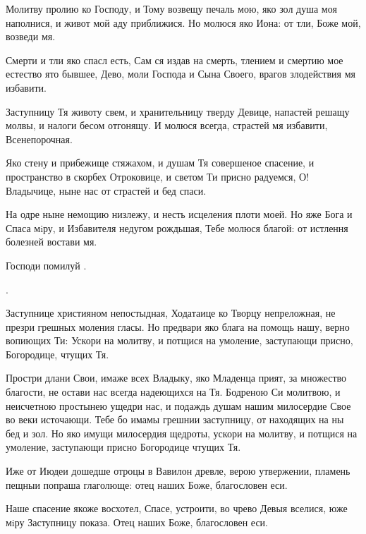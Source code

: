 \begin{mymulticols}
 Молитву пролию ко Господу, и Тому возвещу печаль мою, яко зол душа моя наполнися, и живот мой аду приближися. Но молюся яко Иона: от тли, Боже мой, возведи мя.


Смерти и тли яко спасл есть, Сам ся издав на смерть, тлением и смертию мое естество ято бывшее, Дево, моли Господа и Сына Своего, врагов злодействия мя избавити.


Заступницу Тя животу свем, и хранительницу тверду Девице, напастей решащу молвы, и налоги бесом отгонящу. И молюся всегда, страстей мя избавити, Всенепорочная.

 Яко стену и прибежище стяжахом, и душам Тя совершеное спасение, и пространство в скорбех Отроковице, и светом Ти присно радуемся, О! Владычице, ныне нас от страстей и бед спаси.

 На одре ныне немощию низлежу, и несть исцеления плоти моей. Но яже Бога и Спаса мiру, и Избавителя недугом рождьшая, Тебе молюся благой: от истлення болезней востави мя.

Господи помилуй . 

.




Заступнице християном непостыдная, Ходатаице ко Творцу непреложная, не презри грешных моления гласы. Но предвари яко блага на помощь нашу, верно вопиющих Ти: Ускори на молитву, и потщися на умоление, заступающи присно, Богородице, чтущих Тя.

 Простри длани Свои, имаже всех Владыку, яко Младенца прият, за множество благости, не остави нас всегда надеющихся на Тя. Бодреною Си молитвою, и неисчетною простынею ущедри нас, и подаждь душам нашим милосердие Свое во веки источающи. Тебе бо имамы грешнии заступницу, от находящих на ны бед и зол. Но яко имущи милосердия щедроты, ускори на молитву, и потщися на умоление, заступающи присно Богородице чтущих Тя.



 Иже от Июдеи дошедше отроцы в Вавилон древле, верою утвержении, пламень пещныи попраша глаголюще: отец наших Боже, благословен еси.


Наше спасение якоже восхотел, Спасе, устроити, во чрево Девыя вселися, юже мiру Заступницу показа. Отец наших Боже, благословен еси.


\end{mymulticols}
